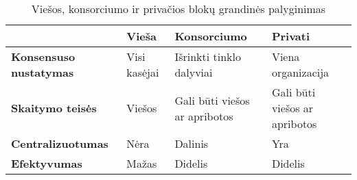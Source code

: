 \begin{table}[htbp]
    \centering
    \caption{Viešos, konsorciumo ir privačios blokų grandinės palyginimas \cite{Zheng2017}}
      \begin{tabular}{|p{8.11em}|l|p{10.22em}|p{6.055em}|}
      \hline
      \multicolumn{1}{|r|}{} & \textbf{Vieša} & \textbf{Konsorciumo} & \textbf{Privati} \bigstrut\\
      \hline
      \textbf{Konsensuso nustatymas} & Visi kasėjai & Išrinkti tinklo dalyviai & Viena organizacija \bigstrut\\
      \hline
      \textbf{Skaitymo teisės} & Viešos & Gali būti viešos ar apribotos & Gali būti viešos ar apribotos \bigstrut\\
      \hline
      \textbf{Centralizuotumas} & Nėra & Dalinis & Yra \bigstrut\\
      \hline
      \textbf{Efektyvumas} & Mažas & Didelis & Didelis \bigstrut\\
      \hline
      \end{tabular}%
    \label{tab:blockchainComparison}%
  \end{table}%
  